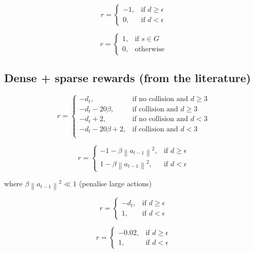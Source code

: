 \documentclass{article}
\newcommand{\norm}[1]{\left\lVert#1\right\rVert}
\begin{document}
\begin{equation}
r = \begin{cases}
    -1, & \text{if $d \geq \epsilon $}\\
    0, & \text{if $d < \epsilon $}
  \end{cases}
\end{equation}

\begin{equation}
r = \begin{cases}
    1, & \text{if $s \in G $}\\
    0, & \text{otherwise}
  \end{cases}
\end{equation}


\subsection{Dense + sparse rewards (from the literature)}

\begin{equation}
r = \begin{cases}
    -d_t, & \text{if no collision and $d \geq 3$}\\
    -d_t - 20\beta , & \text{if collision and $d \geq 3$}\\
    -d_t + 2 , & \text{if no collision and $d < 3$} \\
    -d_t - 20\beta + 2, & \text{if collision and $d < 3$}\\
  \end{cases}
\end{equation}

\begin{equation}
r = \begin{cases}
    - 1 - \beta \norm{a_{t-1}}^2, & \text{if $d \geq \epsilon $}\\
    1 - \beta \norm{a_{t-1}}^2, & \text{if $d < \epsilon $}
  \end{cases}
\end{equation}

where $\beta \norm{a_{t-1}}^2 \ll 1$ (penalise large actions)

\begin{equation}
r = \begin{cases}
    - d_t , & \text{if $d \geq \epsilon $}\\
    1 , & \text{if $d < \epsilon $}
  \end{cases}
\end{equation}

\begin{equation}
r = \begin{cases}
    - 0.02 , & \text{if $d \geq \epsilon $}\\
    1 , & \text{if $d < \epsilon $}
  \end{cases}
\end{equation}
\end{document}
